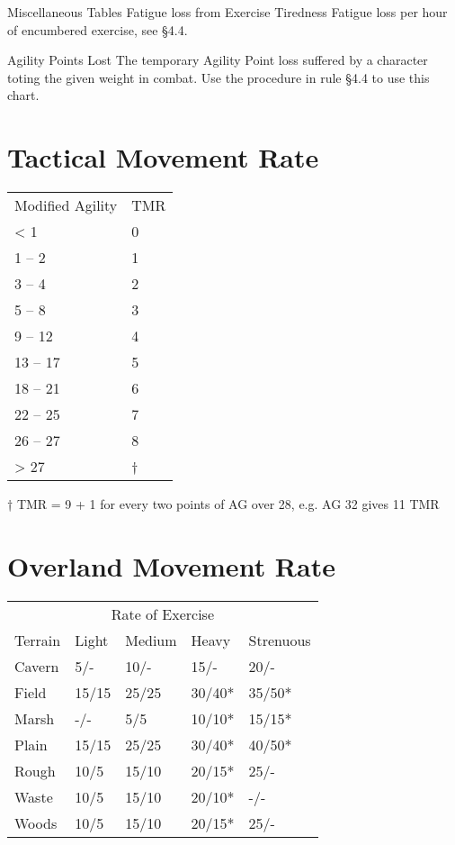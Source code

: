 \begin{Tables}{Miscellaneous Tables}
Fatigue loss from Exercise Tiredness Fatigue loss per hour of
encumbered exercise, see §4.4.

Agility Points Lost The temporary Agility Point loss suffered by a
character toting the given weight in combat.  Use the procedure in
rule §4.4 to use this chart.

\begin{multicols}{2}

\section{Tactical Movement Rate}

\begin{tabularx}{\columnwidth}{Xl}
Modified Agility  & TMR \\
< 1	& 0 \\
1 – 2	& 1 \\
3 – 4	& 2 \\
5 – 8	& 3 \\
9 – 12	& 4 \\
13 – 17	& 5 \\
18 – 21	& 6 \\
22 – 25	& 7 \\
26 – 27	& 8 \\
> 27	& † \\
\end{tabularx}

†  TMR  =  9  +  1  for  every  two  points  of  AG  over 
28, e.g. AG 32 gives 11 TMR 


\section{Overland Movement Rate} 

\begin{tabularx}{\columnwidth}{lllll}
\multicolumn{5}{c}{Rate of Exercise} \\
Terrain		& Light		& Medium	& Heavy		& Strenuous \\
Cavern		& 5/-		& 10/-		& 15/-		& 20/-	\\
Field		& 15/15		& 25/25		& 30/40*	& 35/50* \\
Marsh		& -/-		& 5/5		& 10/10*	& 15/15* \\
Plain		& 15/15		& 25/25		& 30/40*	& 40/50* \\
Rough		& 10/5		& 15/10		& 20/15*	& 25/- \\
Waste		& 10/5		& 15/10		& 20/10*	& -/- \\
Woods		& 10/5		& 15/10		& 20/15*	& 25/- \\
\end{tabularx}


\end{multicols}
\end{Tables}
